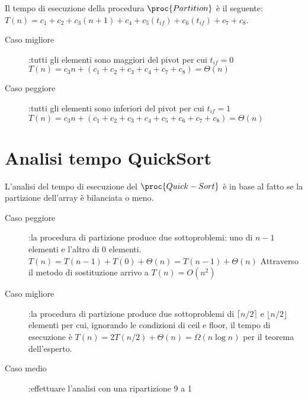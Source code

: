 
Il tempo di esecuzione della procedura $\proc{Partition}$ è il seguente:
$T(n) = c_1 + c_2 + c_3(n+1) + c_4 + c_5(t_{if}) + c_6(t_{if}) + c_7 + c_8$.

\begin{description}
  \item[Caso migliore]:tutti gli elementi sono maggiori del pivot per cui $t_{if} = 0$
        $T(n) = c_3n + (c_1+c_2+c_3+c_4+c_7+c_8) = \Theta(n)$
  \item[Caso peggiore]:tutti gli elementi sono inferiori del pivot per cui $t_{if} = 1$
        $T(n) = c_3n + (c_1+c_2+c_3+c_4+c_5+c_6+c_7+c_8) = \Theta(n)$
\end{description}

\section{Analisi tempo QuickSort}
L'analisi del tempo di esecuzione del $\proc{Quick-Sort}$ è in base al fatto se
la partizione dell'array è bilanciata o meno.
\begin{description}
  \item[Caso peggiore]:la procedura di partizione produce due sottoproblemi:
        uno di $n-1$ elementi e l'altro di $0$ elementi.
        $T(n) = T(n-1) + T(0) + \Theta(n)
              = T(n-1) + \Theta(n)$
        Attraverso il metodo di sostituzione arrivo a $T(n) = O(n^2)$
  \item[Caso migliore]:la procedura di partizione produce due sottoproblemi di $\lceil n/2 \rceil$
        e $\lfloor n/2 \rfloor$ elementi per cui, ignorando le condizioni di ceil e floor,
        il tempo di esecuzione è $T(n) = 2T(n/2) + \Theta(n) = \Omega(n \log n)$ per il teorema dell'esperto.
  \item[Caso medio]:effettuare l'analisi con una ripartizione 9 a 1
\end{description}


